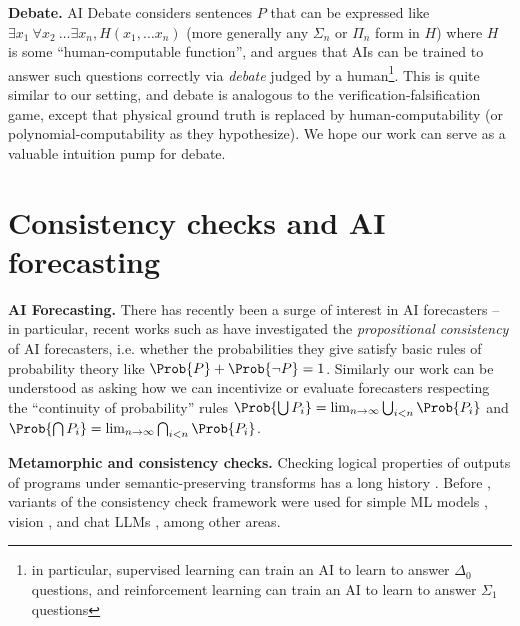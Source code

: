 \textbf{Debate.} AI Debate \citep{irvingAISafetyDebate2018} considers sentences $P$ that can be expressed like $\exists x_1\ \forall x_2\ \dots \exists x_n,H(x_1,\dots x_n)$ (more generally any $\Sigma_n$ or $\Pi_n$ form in $H$) where $H$ is some ``human-computable function'', and argues that AIs can be trained to answer such questions correctly via \emph{debate} judged by a human\footnote{in particular, supervised learning can train an AI to learn to answer $\Delta_0$ questions, and reinforcement learning can train an AI to learn to answer $\Sigma_1$ questions}. This is quite similar to our setting, and debate is analogous to the verification-falsification game, except that physical ground truth is replaced by human-computability (or polynomial-computability as they hypothesize). We hope our work can serve as a valuable intuition pump for debate.

\section{Consistency checks and AI forecasting}\label{litrev:sec:consistency}
\label{cfc:app:related}
\textbf{AI Forecasting.} There has recently been a surge of interest in AI forecasters \citep{zouForecastingFutureWorld2022, schoeneggerLargeLanguageModel2023,yanAutoCastEnhancingWorld2023, halawiApproachingHumanLevelForecasting2024a, schoeneggerWisdomSiliconCrowd2024} -- in particular, recent works such as \citet{sudhirConsistencyChecksLanguage2024} have investigated the \emph{propositional consistency} of AI forecasters, i.e. whether the probabilities they give satisfy basic rules of probability theory like $\Prob{P}+\Prob{\lnot P}=1$. Similarly our work can be understood as asking how we can incentivize or evaluate forecasters respecting the ``continuity of probability'' rules $\Prob{\bigcup P_i}=\lim_{n\to\infty}\bigcup_{i<n}\Prob{P_i}$ and $\Prob{\bigcap P_i}=\lim_{n\to\infty}\bigcap_{i<n}\Prob{P_i}$.

\textbf{Metamorphic and consistency checks.}
Checking logical properties of outputs of programs under semantic-preserving transforms has a long history \citep{chen1998metamorphic}. Before \citet{esmwcc}, variants of the consistency check framework were used for simple ML models \citep{christakis2022specifying, sharma2020monotonicity}, vision \citep{hendrycks2019benchmarking}, and chat LLMs \citep{jang2023consistency}, among other areas.

